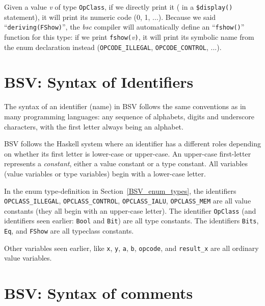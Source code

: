 
Given a value \emph{v} of type \verb|OpClass|, if we directly print it
({\eg} in a \verb|$display()| statement), it will print its numeric
code (0, 1, ...).  Because we said ``\verb|deriving(FShow)|'', the
\emph{bsc} compiler will automatically define an ``\verb|fshow()|''
function for this type: if we print \verb|fshow(|\emph{v}\verb|)|, it
will print its symbolic name from the enum declaration instead
(\verb|OPCODE_ILLEGAL|, \verb|OPCODE_CONTROL|, ...).


\section{BSV: Syntax of Identifiers}

\label{BSV_Syntax_of_Identifiers}


The syntax of an identifier (name) in BSV follows the same conventions
as in many programming languages: any sequence of alphabets, digits
and underscore characters, with the first letter always being an
alphabet.


BSV follows the Haskell system where an identifier has a different
roles depending on whether its first letter is lower-case or
upper-case.  An upper-case first-letter represents a \emph{constant},
either a value constant or a type constant.  All variables (value
variables or type variables) begin with a lower-case letter.

In the enum type-definition in Section~\ref{BSV_enum_types}, the
identifiers \verb|OPCLASS_ILLEGAL|, \verb|OPCLASS_CONTROL|,
\verb|OPCLASS_IALU|, \verb|OPCLASS_MEM| are all value constants (they
all begin with an upper-case letter).  The identifier \verb|OpClass|
(and identifiers seen earlier: \verb|Bool| and \verb|Bit|) are all
type constants.  The identifiers \verb|Bits|, \verb|Eq|, and
\verb|FShow| are all typeclass constants.

Other variables seen earlier, like \verb|x|, \verb|y|, \verb|a|,
\verb|b|, \verb|opcode|, and \verb|result_x| are all ordinary value
variables.


\section{BSV: Syntax of comments}

